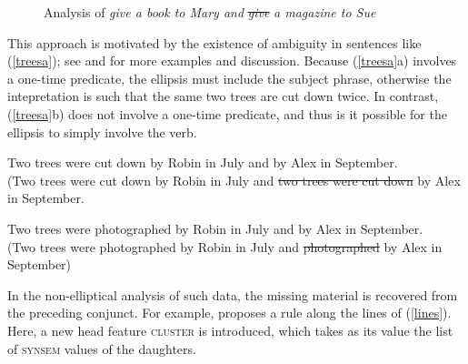 {\begin{figure}
    \centering
{}
    \caption{Analysis of \emph{give a book to Mary and} \sout{\emph{give}} \emph{a magazine to Sue}}\label{lpe}
\end{figure}

\noindent
This approach is motivated by the existence of ambiguity in 
sentences like (\ref{treesa}); see  \citet{Beavers} and \citet{chaves06} for more examples and discussion. Because (\ref{treesa}a) involves a one-time predicate, the ellipsis must include the subject phrase, otherwise
the intepretation is such that the same two trees are cut down twice. In contrast,  (\ref{treesa}b) does not involve a one-time
predicate, and thus is it possible for the ellipsis to simply
involve the verb.


\begin{exe}
\ex 
\begin{xlista}
\ex Two trees were cut down by Robin in July and by Alex in September.\\
(Two trees were cut down by Robin in July and \sout{two trees were cut down} by Alex in September.

\ex Two trees were photographed by Robin in July and by Alex in September.\\
(Two trees were photographed by Robin in July and \sout{photographed} by Alex in September)
\end{xlista}\label{treesa}
\end{exe}



In the non-elliptical analysis of such data, the missing material is recovered from the preceding conjunct. For example, \citet[]{Mouret:06} proposes a rule along the lines of (\ref{lines}).  Here, a new head feature \textsc{cluster} is introduced, which  takes as its value the list of \textsc{synsem} 
values of the  daughters.

\ea
\label{lines}
\label{schema-ac-cx}
 \impl 
{}
\z

}
